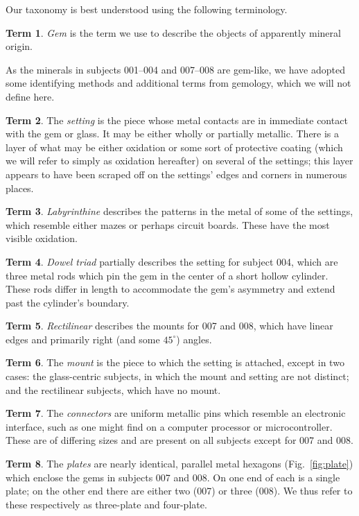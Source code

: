 \documentclass[10pt,twoside,openany]{article}
\theoremstyle{definition}
\newtheorem{term}{Term}
\begin{document}
Our taxonomy is best understood using the following terminology.

\begin{term}
\emph{Gem} is the term we use to describe the objects of apparently mineral origin.
\end{term}
As the minerals in subjects 001--004 and 007--008 are gem-like, we have adopted some identifying methods and additional terms from gemology, which we will not define here.

\begin{term}
The \emph{setting} is the piece whose metal contacts are in immediate contact with the gem or glass. It may be either wholly or partially metallic. There is a layer of what may be either oxidation or some sort of protective coating (which we will refer to simply as oxidation hereafter) on several of the settings; this layer appears to have been scraped off on the settings' edges and corners in numerous places.
\end{term}
\begin{term}
\emph{Labyrinthine} describes the patterns in the metal of some of the settings, which resemble either mazes or perhaps circuit boards. These have the most visible oxidation.
\end{term}
\begin{term}
\emph{Dowel triad} partially describes the setting for subject 004, which are three metal rods which pin the gem in the center of a short hollow cylinder. These rods differ in length to accommodate the gem's asymmetry and extend past the cylinder's boundary. 
\end{term}
\begin{term}
\emph{Rectilinear} describes the mounts for 007 and 008, which have linear edges and primarily right (and some $45^\circ$) angles.
\end{term}
\begin{term}
The \emph{mount} is the piece to which the setting is attached, except in two cases: the glass-centric subjects, in which the mount and setting are not distinct; and the rectilinear subjects, which have no mount.
\end{term}
\begin{term}
The \emph{connectors} are uniform metallic pins which resemble an electronic interface, such as one might find on a computer processor or microcontroller. These are of differing sizes and are present on all subjects except for 007 and 008.
\end{term}
\begin{term}
The \emph{plates} are nearly identical, parallel metal hexagons (Fig.~\ref{fig:plate}) which enclose the gems in subjects 007 and 008. On one end of each is a single plate; on the other end there are either two (007) or three (008). We thus refer to these respectively as three-plate and four-plate.
\end{term}
\end{document}

